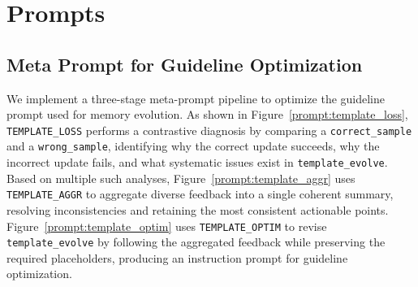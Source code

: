\section{Prompts}

\subsection{Meta Prompt for Guideline Optimization}
We implement a three-stage meta-prompt pipeline to optimize the guideline prompt used for memory evolution. As shown in Figure~\ref{prompt:template_loss}, \texttt{TEMPLATE\_LOSS} performs a contrastive diagnosis by comparing a \texttt{correct\_sample} and a \texttt{wrong\_sample}, identifying why the correct update succeeds, why the incorrect update fails, and what systematic issues exist in \texttt{template\_evolve}. Based on multiple such analyses, Figure~\ref{prompt:template_aggr} uses \texttt{TEMPLATE\_AGGR} to aggregate diverse feedback into a single coherent summary, resolving inconsistencies and retaining the most consistent actionable points. Figure~\ref{prompt:template_optim} uses \texttt{TEMPLATE\_OPTIM} to revise \texttt{template\_evolve} by following the aggregated feedback while preserving the required placeholders, producing an instruction prompt for guideline optimization.

